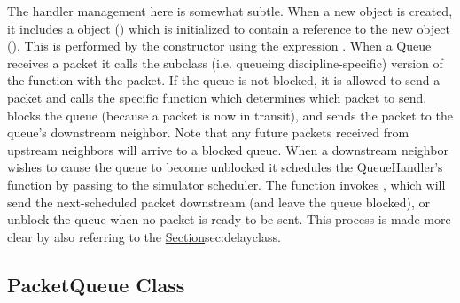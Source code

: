 The handler management here is somewhat subtle.
When a new  object is created,
it includes a  object ()
which is initialized to contain a reference to the new  object
().
This is performed by the  constructor using the expression
.
When a Queue receives a packet it calls the subclass
(i.e. queueing discipline-specific) version of
the  function with the packet.
If the queue is not blocked, it is allowed to send a packet and
calls the specific  function which determines which
packet to send, blocks the queue (because a packet is now in transit), and
sends the packet to the queue's downstream neighbor.
Note that any future packets received from upstream neighbors
will arrive to a blocked queue.
When a downstream neighbor wishes to cause the queue to become unblocked
it schedules the QueueHandler's  function by
passing  to the simulator scheduler.
The  function invokes , which
will send the next-scheduled packet downstream (and leave the queue blocked),
or unblock the queue when no packet is ready to be sent.
This process is made more clear by also referring to the
\href{\fcn[]{LinkDelay::recv} method}{Section}{sec:delayclass}.

\subsection{PacketQueue Class}
\label{sec:packetqclass}


